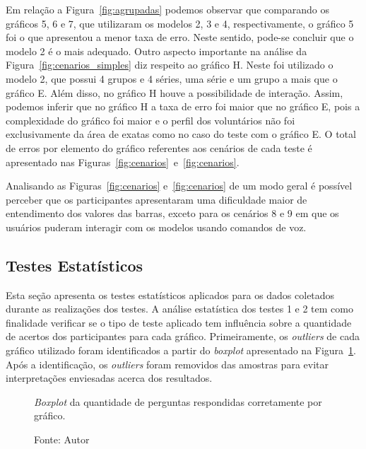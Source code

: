 \documentclass[
	12pt,				%
	openright,			%
	oneside,			%
	a4paper,			%
	english,			%
	brazil				%
	]{abntex2}
\begin{document}
Em relação a Figura~\ref{fig:agrupadas} podemos observar que comparando os gráficos 5, 6 e 7, que utilizaram os modelos 2, 3 e 4, respectivamente, o gráfico 5 foi o que apresentou a menor taxa de erro. Neste sentido, pode-se concluir que o modelo 2 é o mais adequado. Outro aspecto importante na análise da Figura~\ref{fig:cenarios_simples} diz respeito ao gráfico H. Neste foi utilizado o modelo 2, que possui 4 grupos e 4 séries, uma série e um grupo a mais que o gráfico E. Além disso, no gráfico H houve a possibilidade de interação. Assim, podemos inferir que no gráfico H a taxa de erro foi maior que no gráfico E, pois a complexidade do gráfico foi maior e o perfil dos voluntários não foi exclusivamente da área de exatas como no caso do teste com o gráfico E.   
O total de erros por elemento do gráfico referentes aos cenários de cada teste é apresentado nas Figuras~\ref{fig:cenarios}~e~\ref{fig:cenarios}. 

Analisando as Figuras~\ref{fig:cenarios} e~\ref{fig:cenarios} de um modo geral é possível perceber que os participantes apresentaram uma dificuldade maior de entendimento dos valores das barras, exceto para os cenários 8 e 9 em que os usuários puderam interagir com os modelos usando comandos de voz. 

\subsection{Testes Estatísticos}

Esta seção apresenta os testes estatísticos aplicados para os dados coletados durante as realizações dos testes. A análise estatística dos testes 1 e 2 tem como finalidade verificar se o tipo de teste aplicado tem influência sobre a quantidade de acertos dos participantes para cada gráfico. Primeiramente, os \textit{outliers} de cada gráfico utilizado foram identificados a partir do \textit{boxplot} apresentado na Figura~\ref{fig:outliers}. Após a identificação, os \textit{outliers} foram removidos das amostras para evitar interpretações enviesadas acerca dos resultados.

\begin{figure}[!h]
\caption{\textit{\textit{Boxplot}} da quantidade de perguntas respondidas corretamente por gráfico.}
\caption*{Fonte: Autor}
\label{fig:outliers}
\end{figure}
\end{document}
